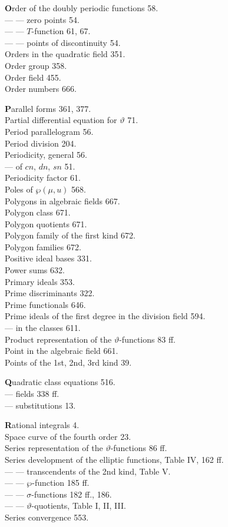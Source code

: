 
\noindent
\begin{minipage}[t]{0.48\textwidth}
\noindent \textbf{O}rder of the doubly periodic functions 58.\\
--- --- zero points 54.\\
--- --- $T$-function 61, 67.\\
--- --- points of discontinuity 54.\\
Orders in the quadratic field 351.\\
Order group 358.\\
Order field 455.\\
Order numbers 666.

\noindent \textbf{P}arallel forms 361, 377.\\
Partial differential equation for $\vartheta$ 71.\\
Period parallelogram 56.\\
Period division 204.\\
Periodicity, general 56.\\
--- of $cn$, $dn$, $sn$ 51.\\
Periodicity factor 61.\\
Poles of $\wp(\mu,u)$ 568.\\
Polygons in algebraic fields 667.\\
Polygon class 671.\\
Polygon quotients 671.\\
Polygon family of the first kind 672.\\
Polygon families 672.\\
Positive ideal bases 331.\\
Power sums 632.\\
Primary ideals 353.\\
Prime discriminants 322.\\
Prime functionals 646.\\
Prime ideals of the first degree in the division field 594.\\
--- in the classes 611.\\
Product representation of the $\vartheta$-functions 83 ff.\\
Point in the algebraic field 661.\\
Points of the 1st, 2nd, 3rd kind 39.

\noindent \textbf{Q}uadratic class equations 516.\\
--- fields 338 ff.\\
--- substitutions 13.

\noindent \textbf{R}ational integrals 4.\\
Space curve of the fourth order 23.\\
Series representation of the $\vartheta$-functions 86 ff.\\
Series development of the elliptic functions, Table IV, 162 ff.\\
--- --- transcendents of the 2nd kind, Table V.\\
--- --- $\wp$-function 185 ff.\\
--- --- $\sigma$-functions 182 ff., 186.\\
--- --- $\vartheta$-quotients, Table I, II, III.\\
Series convergence 553.
\end{minipage}%
